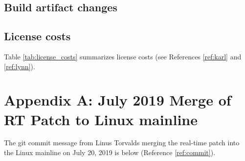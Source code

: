 \documentclass[12pt]{article}
\begin{document}
\subsection{Build artifact changes}

\subsection{License costs}

Table \ref{tab:license_costs} summarizes license costs (see References
\ref{ref:karl} and \ref{ref:lynn}).

\begin{table}[H]
\captionsetup{width=.9\linewidth}
\caption{License costs}
\label{tab:license_costs}
\end{table}


%
\newpage
\section{Appendix A: July 2019 Merge of RT Patch to Linux mainline}

The git commit message from Linus Torvalds merging the real-time patch
into the Linux mainline on July 20, 2019 is below (Reference \ref{ref:commit}).
\end{document}
